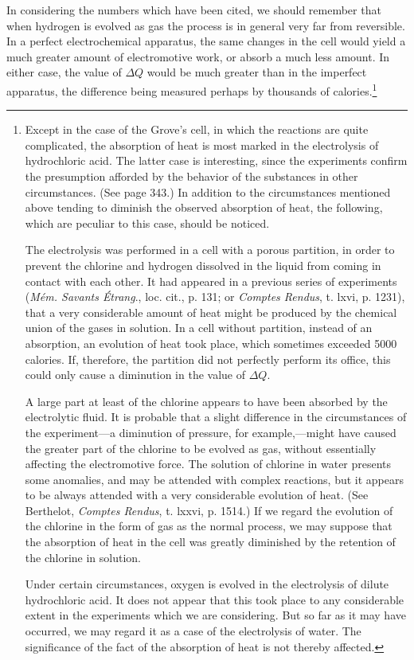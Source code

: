 \documentclass[12pt]{memoir}
\begin{document}
In considering the numbers which have been cited, we should remember that when hydrogen is evolved as gas the process is in general very far from reversible. In a perfect electrochemical apparatus, the same changes in the cell would yield a much greater amount of electromotive work, or absorb a much less amount. In either case, the value of $\Delta Q$ would be much greater than in the imperfect apparatus, the difference being measured perhaps by thousands of calories.\footnote{Except in the case of the Grove's cell, in which the reactions are quite complicated, the absorption of heat is most marked in the electrolysis of hydrochloric acid. The latter case is interesting, since the experiments confirm the presumption afforded by the behavior of the substances in other circumstances. (See page 343.) In addition to the circumstances mentioned above tending to diminish the observed absorption of heat, the following, which are peculiar to this case, should be noticed. \par
The electrolysis was performed in a cell with a porous partition, in order to prevent the chlorine and hydrogen dissolved in the liquid from coming in contact with each other. It had appeared in a previous series of experiments (\textit{M\'{e}m. Savants \'{E}trang}., loc. cit., p. 131; or \textit{Comptes Rendus}, t. lxvi, p. 1231), that a very considerable amount of heat might be produced by the chemical union of the gases in solution. In a cell without partition, instead of an absorption, an evolution of heat took place, which sometimes exceeded 5000 calories. If, therefore, the partition did not perfectly perform its office, this could only cause a diminution in the value of $\Delta Q$. \par
A large part at least of the chlorine appears to have been absorbed by the electrolytic fluid. It is probable that a slight difference in the circumstances of the experiment---a diminution of pressure, for example,---might have caused the greater part of the chlorine to be evolved as gas, without essentially affecting the electromotive force. The solution of chlorine in water presents some anomalies, and may be attended with complex reactions, but it appears to be always attended with a very considerable evolution of heat. (See Berthelot, \textit{Comptes Rendus}, t. lxxvi, p. 1514.) If we regard the evolution of the chlorine in the form of gas as the normal process, we may suppose that the absorption of heat in the cell was greatly diminished by the retention of the chlorine in solution.\par
Under certain circumstances, oxygen is evolved in the electrolysis of dilute hydrochloric acid. It does not appear that this took place to any considerable extent in the experiments which we are considering. But so far as it may have occurred, we may regard it as a case of the electrolysis of water. The significance of the fact of the absorption of heat is not thereby affected.}
\end{document}
